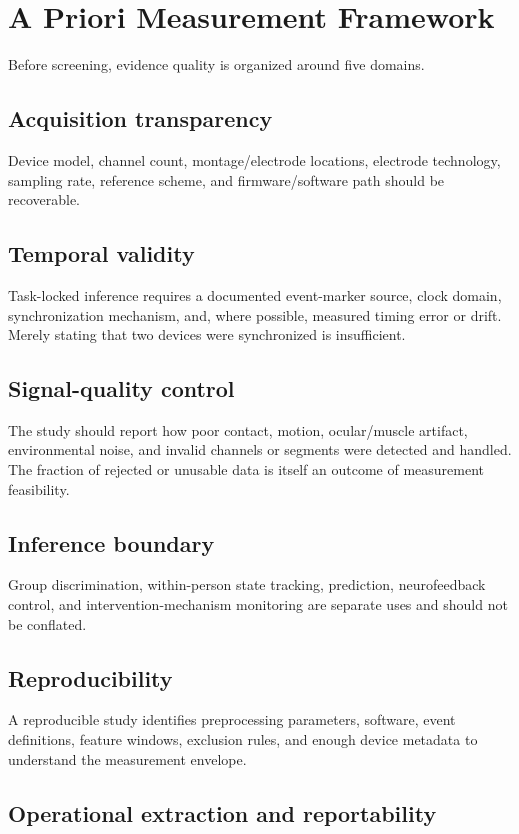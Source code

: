 \section{A Priori Measurement Framework}

Before screening, evidence quality is organized around five domains.

\subsection{Acquisition transparency}
Device model, channel count, montage/electrode locations, electrode technology, sampling rate, reference scheme, and firmware/software path should be recoverable.

\subsection{Temporal validity}
Task-locked inference requires a documented event-marker source, clock domain, synchronization mechanism, and, where possible, measured timing error or drift. Merely stating that two devices were synchronized is insufficient.

\subsection{Signal-quality control}
The study should report how poor contact, motion, ocular/muscle artifact, environmental noise, and invalid channels or segments were detected and handled. The fraction of rejected or unusable data is itself an outcome of measurement feasibility.

\subsection{Inference boundary}
Group discrimination, within-person state tracking, prediction, neurofeedback control, and intervention-mechanism monitoring are separate uses and should not be conflated.

\subsection{Reproducibility}
A reproducible study identifies preprocessing parameters, software, event definitions, feature windows, exclusion rules, and enough device metadata to understand the measurement envelope.


\subsection{Operational extraction and reportability}

